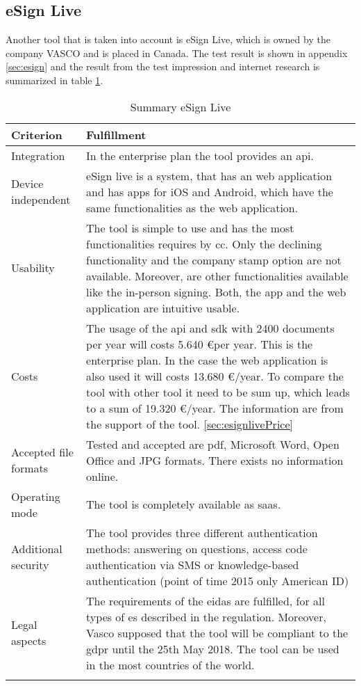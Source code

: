 \subsection{eSign Live}
Another tool that is taken into account is eSign Live, which is owned by the company VASCO and is placed in Canada. The test result is shown in appendix \ref{sec:esign} and the result from the test impression and internet research is summarized in table \ref{tab:esign}.
	\begin{longtable}{|p{4cm}|p{10cm}|} \hline
		Criterion & Fulfillment \\ \hline
		Integration & In the enterprise plan the tool provides an \gls{api}. \parencite{esign2018info} \\ \hline
		Device independent & eSign live is a system, that has an web application and has \glspl{app} for iOS and Android, which have the same functionalities as the web application. \parencite{esign2018info} \\ \hline
		Usability & The tool is simple to use and has the most functionalities requires by \gls{cc}. Only the declining functionality and the company stamp option are not available. Moreover, are other functionalities available like the in-person signing. Both, the \gls{app} and the web application are intuitive usable.  \\ \hline
		Costs & The usage of the \gls{api} and \gls{sdk} with 2400 documents per year will costs 5.640 \euro per year. This is the enterprise plan. In the case the web application is also used it will costs 13.680 \euro/year. To compare the tool with other tool it need to be sum up, which leads to a sum of 19.320 \euro/year. The information are from the support of the tool. \ref{sec:esignlivePrice} \\ \hline
		Accepted file formats & Tested and accepted are \gls{pdf}, Microsoft Word, Open Office and JPG formats. There exists no information online.\\ \hline
		Operating mode & The tool is completely available as \gls{saas}.\\ \hline
		Additional security & The tool provides three different authentication methods: answering on questions, access code authentication via SMS or knowledge-based authentication (point of time 2015 only American ID) \parencite{esign2018security} \\ \hline
		Legal aspects & The requirements of the \gls{eidas} are fulfilled, for all types of \gls{es} described in the regulation. Moreover, Vasco supposed that the tool will be compliant to the \gls{gdpr} until the 25th May 2018. The tool can be used in the most countries of the world. \parencite{esign2018eidas,esign2018legal} \\ \hline
	\caption{Summary eSign Live}
	\label{tab:esign}
	\end{longtable}

